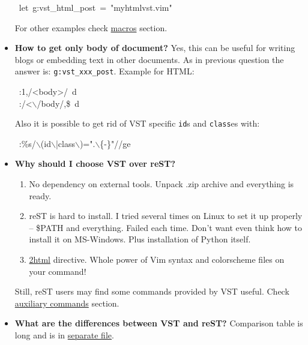 \documentclass[12pt]{article}
\begin{document}
\begin{itemize}
\begin{ttfamily}\begin{flushleft}
\mbox{~let~g:vst\_html\_post~=~"myhtmlvst.vim"}\\
\end{flushleft}\end{ttfamily}

 For other examples check \href{\#lmacros}{macros} section.

\item
\textbf{How to get only body of document?} Yes, this can be useful for writing blogs
or embedding text in other documents. As in previous question the answer is:
\texttt{g:vst\_xxx\_post}. Example for HTML:

\begin{ttfamily}\begin{flushleft}
\mbox{~:1,/<body>/~d}\\
\mbox{~:/<$\backslash$/body/,\$~d}\\
\end{flushleft}\end{ttfamily}

 Also it is possible to get rid of VST specific \texttt{id}s and \texttt{class}es
 with:

\begin{ttfamily}\begin{flushleft}
\mbox{~:\%s/$\backslash$(id$\backslash$|class$\backslash$)=".$\backslash$\{-\}"//ge}\\
\end{flushleft}\end{ttfamily}

\item
\textbf{Why should I choose VST over reST?}

 \begin{enumerate}[label=\arabic*.]
\item
No dependency on external tools. Unpack .zip archive and everything is ready.

\item
reST is hard to install. I tried several times on Linux to set it up
properly -- \$PATH and everything. Failed each time. Don't want even
think how to install it on MS-Windows. Plus installation of Python
itself.

\item
\href{\#l2html}{2html} directive. Whole power of Vim syntax and colorscheme files on
your command!
 \end{enumerate}

 Still, reST users may find some commands provided by VST useful. Check
 \href{\#lauxiliary-commands}{auxiliary commands} section.

\item
\textbf{What are the differences between VST and reST?} Comparison table is long
and is in \href{http://skawina.eu.org/mikolaj/restdiff.html}{separate file}.
\end{itemize}
\hypertarget{lchangelog}{}
\end{document}
